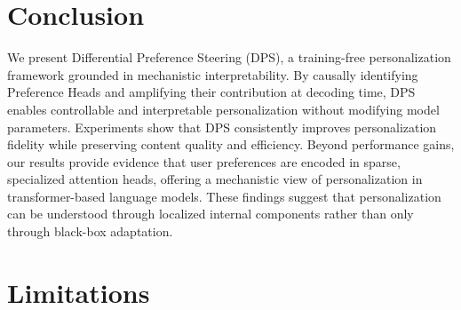 \documentclass[11pt]{article}
\begin{document}
\begin{table}[!t]
\small
\centering
{}
\caption{Human and LLM-based evaluation results on LaMP-4.
Human evaluation reports profile-alignment win rates.
LLM-based evaluation uses GPT-5.2 and reports average per-method ratings on a 1--5 scale.}
\label{tab:human_llm_eval}
\vspace{-0.3cm}
\end{table}



\section{Conclusion}

We present Differential Preference Steering (DPS), a training-free personalization framework grounded in mechanistic interpretability.
By causally identifying Preference Heads and amplifying their contribution at decoding time, DPS enables controllable and interpretable personalization without modifying model parameters.
Experiments show that DPS consistently improves personalization fidelity while preserving content quality and efficiency.
Beyond performance gains, our results provide evidence that user preferences are encoded in sparse, specialized attention heads, offering a mechanistic view of personalization in transformer-based language models.
These findings suggest that personalization can be understood through localized internal components rather than only through black-box adaptation.



\newpage
\section*{Limitations}
\end{document}
